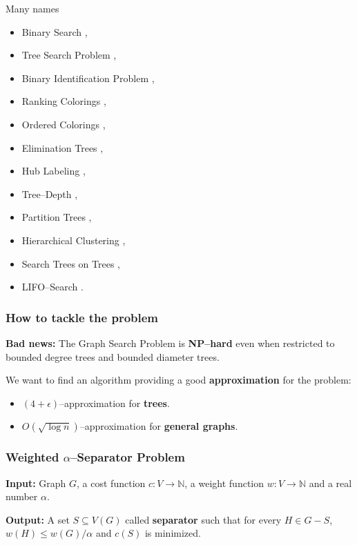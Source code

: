 \documentclass{beamer}
\newcommand{\br}[1]{\mathopen{}\left( #1 \right)}
\begin{document}
\begin{frame}{Many names}
\begin{itemize}
    \item Binary Search \cite{Knuth1973,OnakParys2006GenOfBSSInTsAndFLikePosets,dereniowski2017ApproxSsForGeneralBSinWTs},
    \item Tree Search Problem \cite{Jacobs2010OnTheComplexSearchInTsAvg,Cicalese2016OnTSPwNonUniCost}, 
    \item Binary Identification Problem \cite{Cicalese2012BinIdentPForWTs}, 
    \item Ranking Colorings \cite{Lam1998ERankOfGsIsH,Dereniowski2009ERankOfWTs}, 
    \item Ordered Colorings \cite{KATCHALSKI1995141}, 
    \item Elimination Trees \cite{Pothen1988OptimalEliminationTrees}, 
    \item Hub Labeling \cite{Angelidakis2018ShortestPQ},
    \item Tree–Depth \cite{NESETRIL20061022},
    \item Partition Trees \cite{Hgemo2024TightAB},
    \item Hierarchical Clustering \cite{Acostfunctionforsimilaritybasedhierarchicalclustering,HCObjFsandAlgs,Approximatehierarchicalclusteringviasparsestcutandspreadingmetrics}, 
    \item Search Trees on Trees \cite{SplayTonT,Fast_app_centroid_trees}, 
    \item LIFO–Search \cite{GIANNOPOULOU20122089}. 
\end{itemize}
\end{frame}


\begin{frame}
\frametitle{How to tackle the problem}
\textbf{Bad news:}
The Graph Search Problem is \textbf{NP–hard} even when restricted to bounded degree trees and bounded diameter trees. 
\pause

We want to find an algorithm providing a good \textbf{approximation} for the problem:
\begin{itemize}
    \item $\br{4+\epsilon}$–approximation for \textbf{trees}.
    \item $O\br{\sqrt{\log n}}$–approximation for \textbf{general graphs}.
\end{itemize}
\end{frame}

\begin{frame}
\frametitle{Weighted $\alpha$–Separator Problem}
\begin{tcolorbox}[colback=white, title=Weighted $\alpha$–Separator Problem, fonttitle=\bfseries, breakable]
\textbf{Input:} Graph $G$, a cost function $c\colon V\to \mathbb{N}$, a weight function $w\colon V\to \mathbb{N}$ and a real number $\alpha$.

\pause
\textbf{Output:} A set $S\subseteq V\br{G}$ called \textbf{separator} such that for every $H\in G-S$, $w\br{H}\leq w\br{G}/\alpha$ and $c\br{S}$ is minimized.
\end{tcolorbox}

\end{frame}
\end{document}
